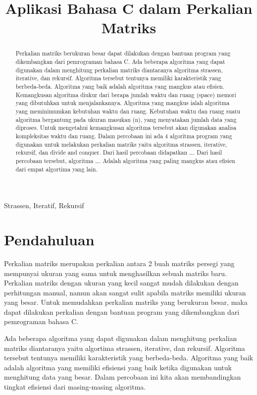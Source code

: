 \documentclass[conference]{IEEEtran}
\title{Aplikasi Bahasa C dalam Perkalian Matriks}
\author{\IEEEauthorblockN{Bayu Aji Nugroho, Muhammad Fauzan, Deovie Lentera}
\IEEEauthorblockA{\textit{School of Electrical Engineering and Informatics}\\
\textit{Institut Teknologi Bandung}\\
Bandung, Indonesia\\
(13221601, 13220009, 18320037) Email: @std.stei.itb.ac.id}
}
\begin{document}
\maketitle

\begin{abstract}
    Perkalian matriks berukuran besar dapat dilakukan dengan bantuan program yang dikembangkan dari pemrograman bahasa C. Ada beberapa algoritma yang dapat digunakan dalam menghitung perkalian matriks diantaranya algoritma strassen, iterative, dan rekursif. Algoritma tersebut tentunya memiliki karakteristik yang berbeda-beda. 
    Algoritma yang baik adalah algoritma yang mangkus atau efisien. Kemangkusan algoritma diukur dari berapa jumlah waktu dan ruang (space) memori yang dibutuhkan untuk menjalankannya. Algoritma yang mangkus ialah algoritma yang meminimumkan kebutuhan waktu dan ruang. Kebutuhan waktu dan ruang suatu algoritma bergantung pada ukuran masukan (n), yang menyatakan jumlah data yang diproses. Untuk mengetahui kemangkusan algoritma tersebut akan digunakan analisa kompleksitas waktu dan ruang.
    Dalam percobaan ini ada 4 algoritma program yang digunakan untuk melakukan perkalian matriks yaitu algoritma strassen, iterative, rekursif, dan divide and conquer. Dari hasil percobaan didapatkan ….
    Dari hasil percobaan tersebut, algoritma ….  Adalah algoritma yang paling mangkus atau efisien dari empat algortima yang lain.
\end{abstract}

\begin{IEEEkeywords}
    Strassen, Iteratif, Rekursif
\end{IEEEkeywords}

\section{Pendahuluan}
Perkalian matriks merupakan perkalian antara 2 buah matriks persegi yang mempunyai ukuran yang sama untuk menghasilkan sebuah matriks baru. Perkalian matriks dengan ukuran yang kecil sangat mudah dilakukan dengan perhitungan manual, namun akan sangat sulit apabila matriks memiliki ukuran yang besar. Untuk memudahkan perkalian matriks yang berukuran besar, maka dapat dilakukan perkalian dengan bantuan program yang dikembangkan dari pemrograman bahasa C. 

Ada beberapa algoritma yang dapat digunakan dalam menghitung perkalian matriks diantaranya yaitu algortima strassen, iterative, dan rekursif. Algoritma tersebut tentunya memiliki karakteristik yang berbeda-beda. Algoritma yang baik adalah algoritma yang memiliki efisiensi yang baik ketika digunakan untuk menghitung data yang besar. Dalam percobaan ini kita akan membandingkan tingkat efisiensi dari masing-masing algoritma. 
\end{document}
